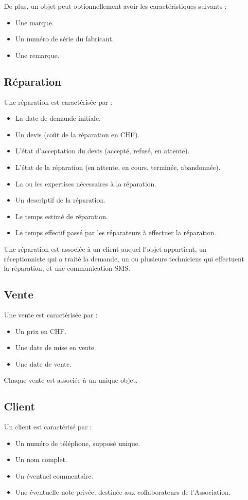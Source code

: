 \documentclass{article}
\begin{document}
De plus, un objet peut optionnellement avoir les caractéristiques suivants :
\begin{itemize}
    \item Une marque.
    \item Un numéro de série du fabricant.
    \item Une remarque.
\end{itemize}

\subsection*{Réparation}
Une réparation est caractérisée par :
\begin{itemize}
    \item La date de demande initiale.
    \item Un devis (coût de la réparation en CHF).
    \item L'état d'acceptation du devis (accepté, refusé, en attente).
    \item L'état de la réparation (en attente, en cours, terminée, abandonnée).
    \item La ou les expertises nécessaires à la réparation.
    \item Un descriptif de la réparation.
    \item Le temps estimé de réparation.
    \item Le temps effectif passé par les réparateurs à effectuer la réparation.
\end{itemize}

Une réparation est associée à un client auquel l'objet appartient, un réceptionniste qui a traité la demande, un ou plusieurs techniciens qui effectuent la réparation, et une communication SMS.

\subsection*{Vente}
Une vente est caractérisée par :
\begin{itemize}
    \item Un prix en CHF.
    \item Une date de mise en vente.
    \item Une date de vente.
\end{itemize}

Chaque vente est associée à un unique objet.

\subsection*{Client}
Un client est caractérisé par :
\begin{itemize}
    \item Un numéro de téléphone, supposé unique.
    \item Un nom complet.
    \item Un éventuel commentaire.
    \item Une éventuelle note privée, destinée aux collaborateurs de l'Association.
\end{itemize}
\end{document}
